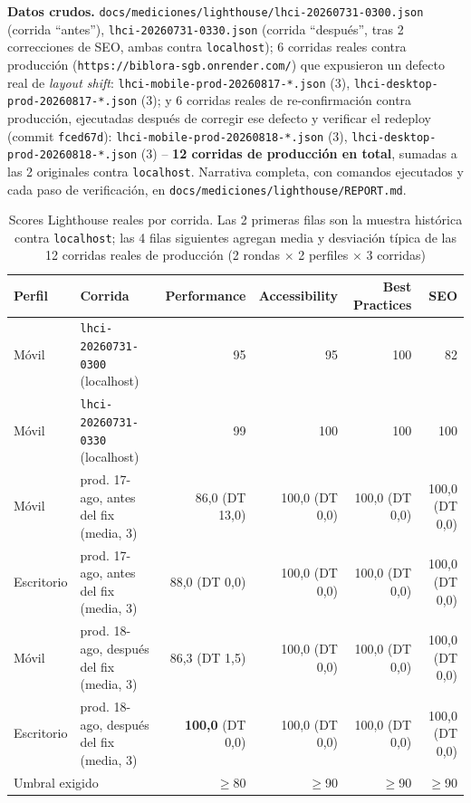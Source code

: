 \textbf{Datos crudos.}
\texttt{docs/mediciones/lighthouse/lhci-20260731-0300.json} (corrida
``antes''), \texttt{lhci-20260731-0330.json} (corrida ``después'', tras 2
correcciones de SEO, ambas contra \texttt{localhost}); 6 corridas reales
contra producción (\texttt{https://biblora-sgb.onrender.com/}) que
expusieron un defecto real de \emph{layout shift}:
\texttt{lhci-mobile-prod-20260817-*.json} (3),
\texttt{lhci-desktop-prod-20260817-*.json} (3); y 6 corridas reales de
re-confirmación contra producción, ejecutadas después de corregir ese
defecto y verificar el redeploy (commit \texttt{fced67d}):
\texttt{lhci-mobile-prod-20260818-*.json} (3),
\texttt{lhci-desktop-prod-20260818-*.json} (3) -- \textbf{12 corridas de
producción en total}, sumadas a las 2 originales contra
\texttt{localhost}. Narrativa completa, con comandos ejecutados y cada
paso de verificación, en \texttt{docs/mediciones/lighthouse/REPORT.md}.

\begin{table}[h]
\centering
\scriptsize
\setlength{\tabcolsep}{2pt}
\begin{tabular}{llrrrr}
\toprule
Perfil & Corrida & Performance & Accessibility & Best Practices & SEO \\
\midrule
Móvil & \texttt{lhci-20260731-0300} (localhost) & 95 & 95 & 100 & 82 \\
Móvil & \texttt{lhci-20260731-0330} (localhost) & 99 & 100 & 100 & 100 \\
Móvil & prod. 17-ago, antes del fix (media, 3) & 86,0 (DT 13,0) & 100,0 (DT 0,0) & 100,0 (DT 0,0) & 100,0 (DT 0,0) \\
Escritorio & prod. 17-ago, antes del fix (media, 3) & 88,0 (DT 0,0) & 100,0 (DT 0,0) & 100,0 (DT 0,0) & 100,0 (DT 0,0) \\
Móvil & prod. 18-ago, después del fix (media, 3) & 86,3 (DT 1,5) & 100,0 (DT 0,0) & 100,0 (DT 0,0) & 100,0 (DT 0,0) \\
Escritorio & prod. 18-ago, después del fix (media, 3) & \textbf{100,0} (DT 0,0) & 100,0 (DT 0,0) & 100,0 (DT 0,0) & 100,0 (DT 0,0) \\
\midrule
\multicolumn{2}{l}{Umbral exigido} & $\geq$80 & $\geq$90 & $\geq$90 & $\geq$90 \\
\bottomrule
\end{tabular}
\caption{Scores Lighthouse reales por corrida. Las 2 primeras filas son
  la muestra histórica contra \texttt{localhost}; las 4 filas
  siguientes agregan media y desviación típica de las 12 corridas
  reales de producción (2 rondas $\times$ 2 perfiles $\times$ 3
  corridas)}
\label{tab:res-lighthouse}
\end{table}

